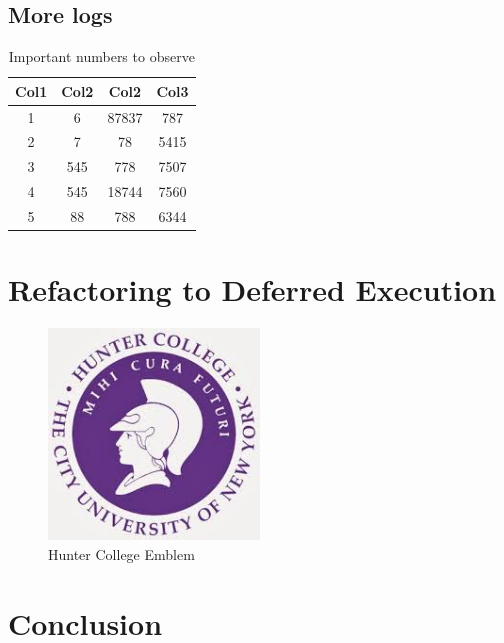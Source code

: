\documentclass[
bibfile=references
]{hunterthesis}
\begin{document}
\lipsum[9]

\section{More logs}

\lipsum[10-15]

\begin{table}[h!]
	\centering
    \label{Tab:Numbers}
    \caption{Important numbers to observe}
	\begin{tabular}{||c c c c||} 
		\hline
		Col1 & Col2 & Col2 & Col3 \\ [0.5ex] 
		\hline\hline
		1 & 6 & 87837 & 787 \\ 
		2 & 7 & 78 & 5415 \\
		3 & 545 & 778 & 7507 \\
		4 & 545 & 18744 & 7560 \\
		5 & 88 & 788 & 6344 \\ [1ex] 
		\hline
	\end{tabular}
\end{table}

\lipsum[20]


\chapter{Refactoring to Deferred Execution}

\lipsum[21]

\begin{figure}[h!]
	\centering
    \caption{Hunter College Emblem}
    \label{Fig:Emblem}
    \includegraphics[width=0.5\textwidth]{Hunter-emblem}
\end{figure}

\lipsum[22-40]


\chapter{Conclusion}

\lipsum[41-50]


\ThesisBackmatter
\end{document}
